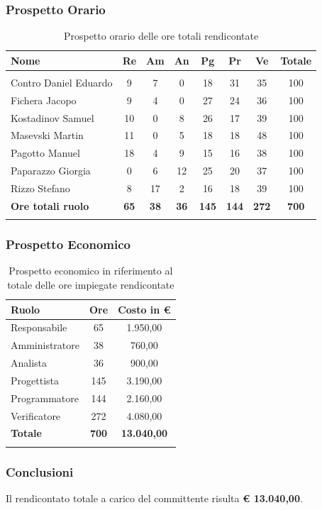 \documentclass[../piano_di_progetto.tex]{subfiles}
\begin{document}
\subsubsection{Prospetto Orario}
\begin{center}
	\begin{longtable}{|l|c|c|c|c|c|c|c|}
		\hline
		\rowcolor{lightgray}
		\textbf{Nome} & \textbf{Re} & \textbf{Am} & \textbf{An} & \textbf{Pg}  & \textbf{Pr}   & \textbf{Ve} & \textbf{Totale} \\
		\hline
		\endhead
		
		\hline
		\rowcolor{white}
		\multicolumn{8}{|c|}{\emph{Continua alla pagina successiva...}}\\
		\hline
		\endfoot

		\endlastfoot
			Contro Daniel Eduardo & 9 & 7 & 0 & 18 & 31 & 35 & 100 \\
			Fichera Jacopo & 9 & 4 & 0 & 27 & 24 & 36 & 100 \\
			Kostadinov Samuel & 10 & 0 & 8 & 26 & 17 & 39 & 100 \\		
			Masevski Martin & 11 & 0 & 5 & 18 & 18 & 48 & 100 \\
			Pagotto Manuel & 18 & 4 & 9 & 15 & 16 & 38 & 100 \\			
			Paparazzo Giorgia & 0 & 6 & 12 & 25 & 20 & 37 & 100 \\
			Rizzo Stefano & 8 & 17 & 2 & 16 & 18 & 39 & 100 \\
			\hline
			\textbf{Ore totali ruolo} & \textbf{65} & \textbf{38} & \textbf{36} & \textbf{145} & \textbf{144} & \textbf{272} & \textbf{700} \\
		\hline	
		\rowcolor{white}
		\caption{Prospetto orario delle ore totali rendicontate}
	\end{longtable}
\end{center}
\subsubsection{Prospetto Economico}
\begin{center}
	\begin{longtable}{|l|c|c|}
		\hline
		\rowcolor{lightgray}
		\textbf{Ruolo} & \textbf{Ore} & \textbf{Costo in €}\\
		\hline
		
		Responsabile & 65 & 1.950,00 \\
		Amministratore & 38 & 760,00 \\
		Analista & 36 & 900,00 \\
		Progettista & 145 & 3.190,00 \\
		Programmatore & 144 & 2.160,00 \\
		Verificatore & 272 & 4.080,00 \\
		\hline
		\textbf{Totale} & \textbf{700} & \textbf{13.040,00}\\
		\hline
		\rowcolor{white}
		\caption{Prospetto economico in riferimento al totale delle ore impiegate rendicontate}
	\end{longtable}
\end{center}

\subsubsection{Conclusioni}
\label{ssub:prev_conc}
Il rendicontato totale a carico del committente risulta \textbf{€ 13.040,00}.
\end{document}
